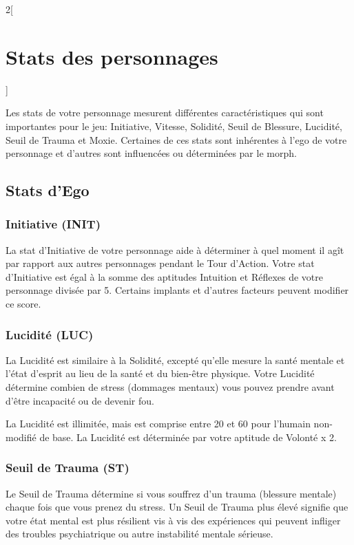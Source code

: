 \documentclass[a4paper,9pt]{article}
\begin{document}
\begin{multicols}{2}[\section{Stats des personnages} \label{sec:character-stats}]

Les stats de votre personnage mesurent différentes caractéristiques qui sont
importantes pour le jeu: Initiative, Vitesse, Solidité, Seuil de Blessure,
Lucidité, Seuil de Trauma et Moxie. Certaines de ces stats sont inhérentes à
l'ego de votre personnage et d'autres sont influencées ou déterminées par le
morph. 

\subsection{Stats d'Ego}

\subsubsection{Initiative (INIT)} \label{sec:initiative-init} 

La stat d'Initiative de votre personnage aide à déterminer à quel moment il
agît par rapport aux autres personnages pendant le Tour d'Action. Votre stat
d'Initiative est égal à la somme des aptitudes Intuition et Réflexes de votre
personnage divisée par 5. Certains implants et d'autres facteurs peuvent
modifier ce score. 

\subsubsection{Lucidité (LUC)} \label{sec:lucidity-luc} 

La Lucidité est similaire à la Solidité, excepté qu'elle mesure la santé
mentale et l'état d'esprit au lieu de la santé et du bien-être physique. Votre
Lucidité détermine combien de stress (dommages mentaux) vous pouvez prendre
avant d'être incapacité ou de devenir fou. 

La Lucidité est illimitée, mais est comprise entre 20 et 60 pour l'humain
non-modifié de base. La Lucidité est déterminée par votre aptitude de Volonté x
2. 

\subsubsection{Seuil de Trauma (ST)} \label{sec:trauma-threshold-tt} 

Le Seuil de Trauma détermine si vous souffrez d'un trauma (blessure mentale)
chaque fois que vous prenez du stress. Un Seuil de Trauma plus élevé signifie
que votre état mental est plus résilient vis à vis des expériences qui peuvent
infliger des troubles psychiatrique ou autre instabilité mentale sérieuse. 


\end{multicols}
\end{document}

